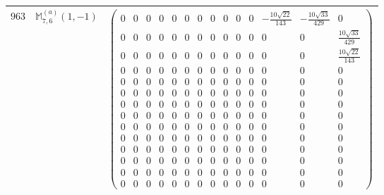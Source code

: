 \documentclass[fleqn,8pt,landscape]{jsarticle}
\begin{document}
\begin{center}
\begin{longtable}{ccc}
$ 963 $ & $ \mathbb{M}_{7,6}^{(a)}(1,-1) $ & $ \begin{pmatrix} 0 & 0 & 0 & 0 & 0 & 0 & 0 & 0 & 0 & 0 & 0 & - \frac{10 \sqrt{22}}{143} & - \frac{10 \sqrt{33}}{429} & 0 \\ 0 & 0 & 0 & 0 & 0 & 0 & 0 & 0 & 0 & 0 & 0 & 0 & 0 & \frac{10 \sqrt{33}}{429} \\ 0 & 0 & 0 & 0 & 0 & 0 & 0 & 0 & 0 & 0 & 0 & 0 & 0 & \frac{10 \sqrt{22}}{143} \\ 0 & 0 & 0 & 0 & 0 & 0 & 0 & 0 & 0 & 0 & 0 & 0 & 0 & 0 \\ 0 & 0 & 0 & 0 & 0 & 0 & 0 & 0 & 0 & 0 & 0 & 0 & 0 & 0 \\ 0 & 0 & 0 & 0 & 0 & 0 & 0 & 0 & 0 & 0 & 0 & 0 & 0 & 0 \\ 0 & 0 & 0 & 0 & 0 & 0 & 0 & 0 & 0 & 0 & 0 & 0 & 0 & 0 \\ 0 & 0 & 0 & 0 & 0 & 0 & 0 & 0 & 0 & 0 & 0 & 0 & 0 & 0 \\ 0 & 0 & 0 & 0 & 0 & 0 & 0 & 0 & 0 & 0 & 0 & 0 & 0 & 0 \\ 0 & 0 & 0 & 0 & 0 & 0 & 0 & 0 & 0 & 0 & 0 & 0 & 0 & 0 \\ 0 & 0 & 0 & 0 & 0 & 0 & 0 & 0 & 0 & 0 & 0 & 0 & 0 & 0 \\ 0 & 0 & 0 & 0 & 0 & 0 & 0 & 0 & 0 & 0 & 0 & 0 & 0 & 0 \\ 0 & 0 & 0 & 0 & 0 & 0 & 0 & 0 & 0 & 0 & 0 & 0 & 0 & 0 \\ 0 & 0 & 0 & 0 & 0 & 0 & 0 & 0 & 0 & 0 & 0 & 0 & 0 & 0 \end{pmatrix} $ \\ \hline

\end{longtable}
\end{center}
\end{document}
